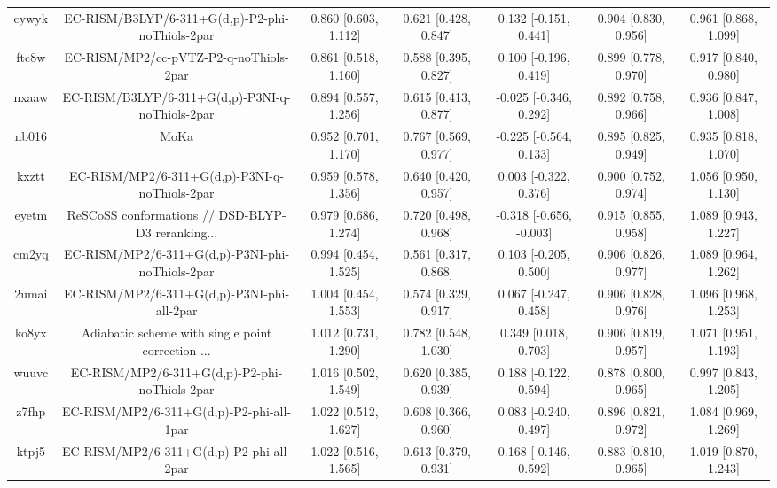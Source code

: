 \documentclass{article}
\begin{document}
\begin{center}
\begin{longtable}{|ccccccc|}
 cywyk &    EC-RISM/B3LYP/6-311+G(d,p)-P2-phi-noThiols-2par &  0.860 [0.603, 1.112] &  0.621 [0.428, 0.847] &    0.132 [-0.151, 0.441] &  0.904 [0.830, 0.956] &   0.961 [0.868, 1.099] \\
 ftc8w &             EC-RISM/MP2/cc-pVTZ-P2-q-noThiols-2par &  0.861 [0.518, 1.160] &  0.588 [0.395, 0.827] &    0.100 [-0.196, 0.419] &  0.899 [0.778, 0.970] &   0.917 [0.840, 0.980] \\
 nxaaw &    EC-RISM/B3LYP/6-311+G(d,p)-P3NI-q-noThiols-2par &  0.894 [0.557, 1.256] &  0.615 [0.413, 0.877] &   -0.025 [-0.346, 0.292] &  0.892 [0.758, 0.966] &   0.936 [0.847, 1.008] \\
 nb016 &                                               MoKa &  0.952 [0.701, 1.170] &  0.767 [0.569, 0.977] &   -0.225 [-0.564, 0.133] &  0.895 [0.825, 0.949] &   0.935 [0.818, 1.070] \\
 kxztt &      EC-RISM/MP2/6-311+G(d,p)-P3NI-q-noThiols-2par &  0.959 [0.578, 1.356] &  0.640 [0.420, 0.957] &    0.003 [-0.322, 0.376] &  0.900 [0.752, 0.974] &   1.056 [0.950, 1.130] \\
 eyetm &  ReSCoSS conformations // DSD-BLYP-D3 reranking... &  0.979 [0.686, 1.274] &  0.720 [0.498, 0.968] &  -0.318 [-0.656, -0.003] &  0.915 [0.855, 0.958] &   1.089 [0.943, 1.227] \\
 cm2yq &    EC-RISM/MP2/6-311+G(d,p)-P3NI-phi-noThiols-2par &  0.994 [0.454, 1.525] &  0.561 [0.317, 0.868] &    0.103 [-0.205, 0.500] &  0.906 [0.826, 0.977] &   1.089 [0.964, 1.262] \\
 2umai &         EC-RISM/MP2/6-311+G(d,p)-P3NI-phi-all-2par &  1.004 [0.454, 1.553] &  0.574 [0.329, 0.917] &    0.067 [-0.247, 0.458] &  0.906 [0.828, 0.976] &   1.096 [0.968, 1.253] \\
 ko8yx &  Adiabatic scheme with single point correction ... &  1.012 [0.731, 1.290] &  0.782 [0.548, 1.030] &     0.349 [0.018, 0.703] &  0.906 [0.819, 0.957] &   1.071 [0.951, 1.193] \\
 wuuvc &      EC-RISM/MP2/6-311+G(d,p)-P2-phi-noThiols-2par &  1.016 [0.502, 1.549] &  0.620 [0.385, 0.939] &    0.188 [-0.122, 0.594] &  0.878 [0.800, 0.965] &   0.997 [0.843, 1.205] \\
 z7fhp &           EC-RISM/MP2/6-311+G(d,p)-P2-phi-all-1par &  1.022 [0.512, 1.627] &  0.608 [0.366, 0.960] &    0.083 [-0.240, 0.497] &  0.896 [0.821, 0.972] &   1.084 [0.969, 1.269] \\
 ktpj5 &           EC-RISM/MP2/6-311+G(d,p)-P2-phi-all-2par &  1.022 [0.516, 1.565] &  0.613 [0.379, 0.931] &    0.168 [-0.146, 0.592] &  0.883 [0.810, 0.965] &   1.019 [0.870, 1.243] \\

\end{longtable}
\end{center}
\end{document}
